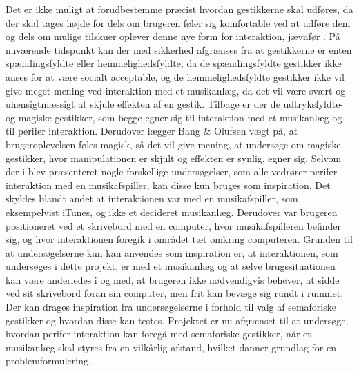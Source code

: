 Det er ikke muligt at forudbestemme præcist hvordan gestikkerne skal udføres, da der skal tages højde for dels om brugeren føler sig komfortable ved at udføre dem og dels om mulige tilskuer oplever denne nye form for interaktion, jævnfør . På nuværende tidspunkt kan der med sikkerhed afgrænses fra at gestikkerne er enten spændingsfyldte eller hemmelighedsfyldte, da de spændingsfyldte gestikker ikke anses for at være socialt acceptable, \parencite[s. 277]{PDF:WouldYouDoThat} og de hemmelighedsfyldte gestikker ikke vil give meget mening ved interaktion med et musikanlæg, da det vil være svært og uhensigtmæssigt at skjule effekten af en gestik. Tilbage er der de udtryksfyldte- og magiske gestikker, som begge egner sig til interaktion med et musikanlæg og til perifer interaktion. Derudover lægger Bang $\&$ Olufsen vægt på, at brugeroplevelsen føles magisk, så det vil give mening, at undersøge om magiske gestikker, hvor manipulationen er skjult og effekten er synlig, egner sig. \blankline
%
Selvom der i  blev præsenteret nogle forskellige undersøgelser, som alle vedrører perifer interaktion med en musikafspiller, kan disse kun bruges som inspiration. Det skyldes blandt andet at interaktionen var med en musikafspiller, som eksempelvist iTunes, og ikke et decideret musikanlæg. Derudover var brugeren positioneret ved et skrivebord med en computer, hvor musikafspilleren befinder sig, og hvor interaktionen foregik i området tæt omkring computeren. Grunden til at undersøgelserne kun kan anvendes som inspiration er, at interaktionen, som undersøges i dette projekt, er med et musikanlæg og at selve brugssituationen kan være anderledes i og med, at brugeren ikke nødvendigvis behøver, at sidde ved sit skrivebord foran sin computer, men frit kan bevæge sig rundt i rummet. Der kan drages inspiration fra undersøgelserne i forhold til valg af semaforiske gestikker og hvordan disse kan testes.\blankline
%
Projektet er nu afgrænset til at undersøge, hvordan perifer interaktion kan foregå med semaforiske gestikker, når et musikanlæg skal styres fra en vilkårlig afstand, hvilket danner grundlag for en problemformulering.
